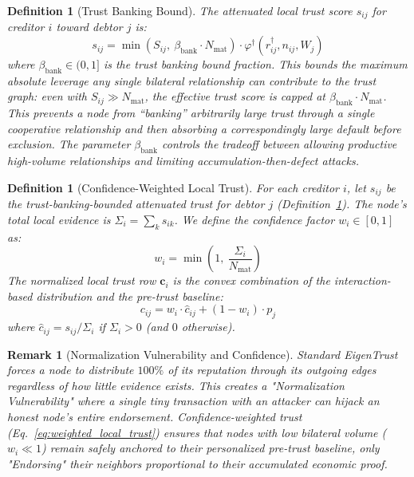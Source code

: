 \documentclass[11pt]{article}
\newtheorem{definition}[theorem]{Definition}
\newtheorem{remark}[theorem]{Remark}
\begin{document}
\begin{definition}[Trust Banking Bound]\label{def:trust_banking}
The \emph{attenuated local trust score} $s_{ij}$ for creditor $i$ toward debtor $j$ is:
\begin{equation}\label{eq:trust_banking}
    s_{ij} = \min\!\left(S_{ij},\ \beta_{\text{bank}} \cdot N_{\text{mat}}\right) \cdot \varphi^{\dagger}(r^{\dagger}_{ij}, n_{ij}, W_j)
\end{equation}
where $\beta_{\text{bank}} \in (0,1]$ is the \emph{trust banking bound fraction}. This bounds the maximum absolute leverage any single bilateral relationship can contribute to the trust graph: even with $S_{ij} \gg N_{\text{mat}}$, the effective trust score is capped at $\beta_{\text{bank}} \cdot N_{\text{mat}}$. This prevents a node from ``banking'' arbitrarily large trust through a single cooperative relationship and then absorbing a correspondingly large default before exclusion. The parameter $\beta_{\text{bank}}$ controls the tradeoff between allowing productive high-volume relationships and limiting accumulation-then-defect attacks.
\end{definition}

\begin{definition}[Confidence-Weighted Local Trust]\label{def:local_trust}
For each creditor $i$, let $s_{ij}$ be the trust-banking-bounded attenuated trust for debtor $j$ (Definition~\ref{def:trust_banking}). The node's \emph{total local evidence} is $\Sigma_i = \sum_k s_{ik}$. We define the \emph{confidence factor} $w_i \in [0, 1]$ as:
\begin{equation}\label{eq:confidence}
    w_i = \min\!\left(1,\ \frac{\Sigma_i}{N_{\text{mat}}}\right)
\end{equation}
The normalized local trust row $\mathbf{c}_i$ is the convex combination of the interaction-based distribution and the pre-trust baseline:
\begin{equation}\label{eq:weighted_local_trust}
    c_{ij} = w_i \cdot \hat{c}_{ij} + (1 - w_i) \cdot p_j
\end{equation}
where $\hat{c}_{ij} = s_{ij} / \Sigma_i$ if $\Sigma_i > 0$ (and $0$ otherwise). 
\end{definition}

\begin{remark}[Normalization Vulnerability and Confidence]
Standard EigenTrust forces a node to distribute $100\%$ of its reputation through its outgoing edges regardless of how little evidence exists. This creates a "Normalization Vulnerability" where a single tiny transaction with an attacker can hijack an honest node's entire endorsement. Confidence-weighted trust (Eq.~\eqref{eq:weighted_local_trust}) ensures that nodes with low bilateral volume ($w_i \ll 1$) remain safely anchored to their personalized pre-trust baseline, only "Endorsing" their neighbors proportional to their accumulated economic proof.
\end{remark}
\end{document}
